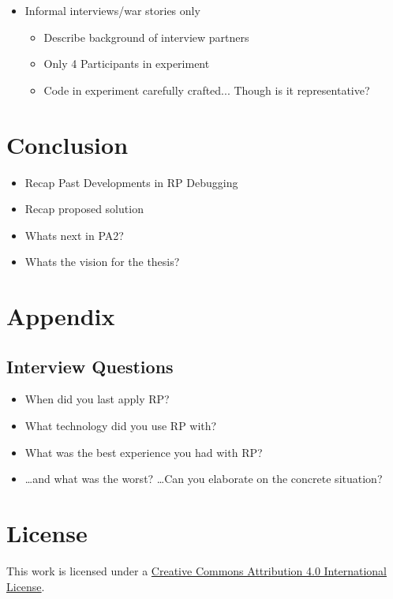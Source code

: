\documentclass[12pt,a4paper]{article}
\begin{document}
\begin{itemize}
	\item Informal interviews/war stories only
	\begin{itemize}
		\item Describe background of interview partners
		\item Only 4 Participants in experiment
		\item Code in experiment carefully crafted... Though is it representative?
		\
	\end{itemize}
\end{itemize}

\section{Conclusion}
\label{sec:conclusion}

\begin{itemize}
	\item Recap Past Developments in RP Debugging
	\item Recap proposed solution
	\item Whats next in PA2?
	\item Whats the vision for the thesis?
\end{itemize}


\section{Appendix}

\subsection{Interview Questions}
\label{sec:interviewquestions}

\begin{itemize}
	\item When did you last apply RP?
	\item What technology did you use RP with?
	\item What was the best experience you had with RP?
	\item \dots and what was the worst? \dots Can you elaborate on the concrete situation?
\end{itemize}




\section*{License}
\ccby\thinspace\thinspace This work is licensed under a \href{https://creativecommons.org/licenses/by/4.0/}{Creative Commons Attribution 4.0 International License}.
\end{document}
